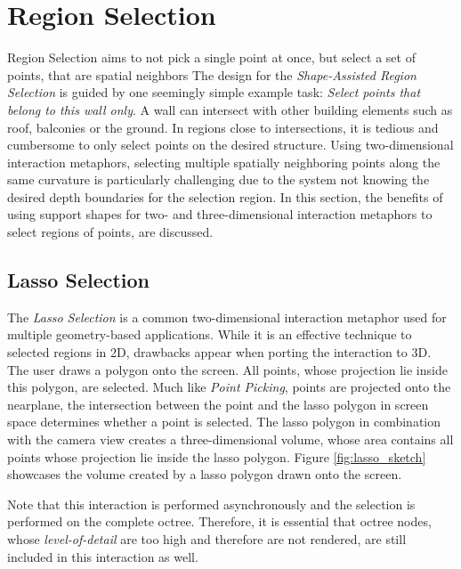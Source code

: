 \section{Region Selection}
\label{sec:regionSelection}

Region Selection aims to not pick a single point at once, but select a set of points, that are spatial neighbors
The design for the \textit{Shape-Assisted Region Selection} is guided by one seemingly simple example task: \textit{Select points that belong to this wall only}. A wall can intersect with other building elements such as roof, balconies or the ground. In regions close to intersections, it is tedious and cumbersome to only select points on the desired structure. Using two-dimensional interaction metaphors, selecting multiple spatially neighboring points along the same curvature is particularly challenging due to the system not knowing the desired depth boundaries for the selection region. In this section, the benefits of using support shapes for two- and three-dimensional interaction metaphors to select regions of points,  are discussed. 


\subsection{Lasso Selection}

The \textit{Lasso Selection} is a common two-dimensional interaction metaphor used for multiple geometry-based applications. While it is an effective technique to selected regions in 2D, drawbacks appear when porting the interaction to 3D. The user draws a polygon onto the screen. All points, whose projection lie inside this polygon, are selected. Much like \textit{Point Picking}, points are projected onto the nearplane, the intersection between the point and the lasso polygon in screen space determines whether a point is selected. The lasso polygon in combination with the camera view creates a three-dimensional volume, whose area contains all points whose projection lie inside the lasso polygon. Figure \ref{fig:lasso_sketch} showcases the volume created by a lasso polygon drawn onto the screen.

Note that this interaction is performed asynchronously and the selection is performed on the complete octree. Therefore, it is essential that octree nodes, whose \textit{level-of-detail} are too high and therefore are not rendered, are still included in this interaction as well. 


